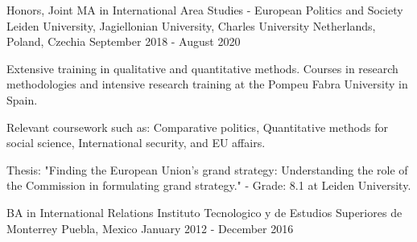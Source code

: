 

\begin{cventries}

  \cventry
    {Honors, Joint MA in International Area Studies - European Politics and Society} %
    {Leiden University, Jagiellonian University, Charles University} %
    {Netherlands, Poland, Czechia} %
    {September 2018 - August 2020} %
    {
      \begin{cvitems} %
        \item {Extensive training in qualitative and quantitative methods. Courses in research methodologies and intensive research training at the Pompeu Fabra University in Spain.}
        \item {Relevant coursework such as: Comparative politics, Quantitative methods for social science, International security, and EU affairs.}
        \item {Thesis: "Finding the European Union's grand strategy: Understanding the role of the Commission in formulating grand strategy." - Grade: 8.1 at Leiden University.}
      \end{cvitems}
    }
  \cventry
    {BA in International Relations} %
    {Instituto Tecnologico y de Estudios Superiores de Monterrey} %
    {Puebla, Mexico} %
    {January 2012 - December 2016} %
    {
      \begin{cvitems} %
      \end{cvitems}
    }

\end{cventries}
